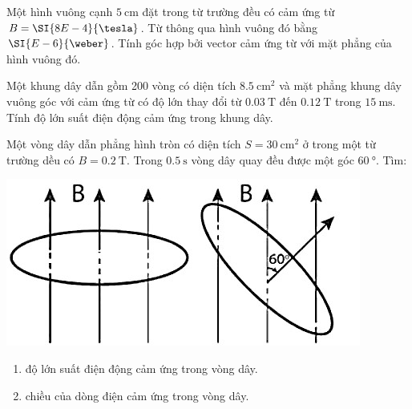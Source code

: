 \begin{ex}
	Một hình vuông cạnh $\SI{5}{\centi\meter}$ đặt trong từ trường đều có cảm ứng từ $B=\SI{8E-4}{\tesla}$. Từ thông qua hình vuông đó bằng $\SI{E-6}{\weber}$. Tính góc hợp bởi vector cảm ứng từ với mặt phẳng của hình vuông đó.
\end{ex}
\begin{ex}
	Một khung dây dẫn gồm 200 vòng có diện tích $\SI{8.5}{\centi\meter^2}$ và mặt phẳng khung dây vuông góc với cảm ứng từ có độ lớn thay đổi từ $\SI{0.03}{\tesla}$ đến $\SI{0.12}{\tesla}$ trong $\SI{15}{\milli\second}$. Tính độ lớn suất điện động cảm ứng trong khung dây.
\end{ex}
\begin{ex}
	Một vòng dây dẫn phẳng hình tròn có diện tích $S=\SI{30}{\centi\meter^2}$ ở trong một từ trường dều có $B=\SI{0.2}{\tesla}$. Trong $\SI{0.5}{\second}$ vòng dây quay đều được một góc $\SI{60}{\degree}$. Tìm:
	\begin{center}
		\includegraphics[width=0.3\linewidth]{figs/VN12-Y24-PH-SYL-020P-21}
	\end{center}
	\begin{enumerate}[label=\alph*)]
		\item độ lớn suất điện động cảm ứng trong vòng dây.
		\item chiều của dòng điện cảm ứng trong vòng dây.
	\end{enumerate}
\end{ex}
